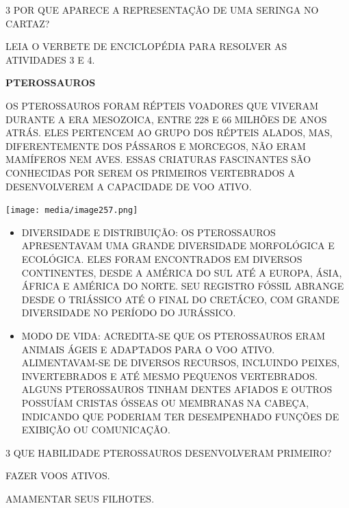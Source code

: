 \num{3} POR QUE APARECE A REPRESENTAÇÃO DE UMA SERINGA NO CARTAZ?


LEIA O VERBETE DE ENCICLOPÉDIA PARA RESOLVER AS ATIVIDADES 3 E 4.

\begin{myquote}
\textbf{PTEROSSAUROS}

OS PTEROSSAUROS FORAM RÉPTEIS VOADORES QUE VIVERAM DURANTE A ERA MESOZOICA, ENTRE 228 E 66 MILHÕES DE ANOS ATRÁS. ELES PERTENCEM AO GRUPO DOS RÉPTEIS ALADOS, MAS, DIFERENTEMENTE DOS PÁSSAROS E MORCEGOS, NÃO ERAM MAMÍFEROS NEM AVES. ESSAS CRIATURAS FASCINANTES SÃO CONHECIDAS POR SEREM OS PRIMEIROS VERTEBRADOS A DESENVOLVEREM A CAPACIDADE DE VOO ATIVO.

\begin{center}
\texttt{[image: media/image257.png]}
\end{center}

\begin{itemize}
\item DIVERSIDADE E DISTRIBUIÇÃO:
OS PTEROSSAUROS APRESENTAVAM UMA GRANDE DIVERSIDADE MORFOLÓGICA E ECOLÓGICA. ELES FORAM ENCONTRADOS EM DIVERSOS CONTINENTES, DESDE A AMÉRICA DO SUL ATÉ A EUROPA, ÁSIA, ÁFRICA E AMÉRICA DO NORTE. SEU REGISTRO FÓSSIL ABRANGE DESDE O TRIÁSSICO ATÉ O FINAL DO CRETÁCEO, COM GRANDE DIVERSIDADE NO PERÍODO DO JURÁSSICO.

\item MODO DE VIDA:
ACREDITA-SE QUE OS PTEROSSAUROS ERAM ANIMAIS ÁGEIS E ADAPTADOS PARA O VOO ATIVO. ALIMENTAVAM-SE DE DIVERSOS RECURSOS, INCLUINDO PEIXES, INVERTEBRADOS E ATÉ MESMO PEQUENOS VERTEBRADOS. ALGUNS PTEROSSAUROS TINHAM DENTES AFIADOS E OUTROS POSSUÍAM CRISTAS ÓSSEAS OU MEMBRANAS NA CABEÇA, INDICANDO QUE PODERIAM TER DESEMPENHADO FUNÇÕES DE EXIBIÇÃO OU COMUNICAÇÃO.
\end{itemize}

\end{myquote}

\num{3} QUE HABILIDADE PTEROSSAUROS DESENVOLVERAM PRIMEIRO?

\begin{boxlist}
 FAZER VOOS ATIVOS.

 AMAMENTAR SEUS FILHOTES.
\end{boxlist}

